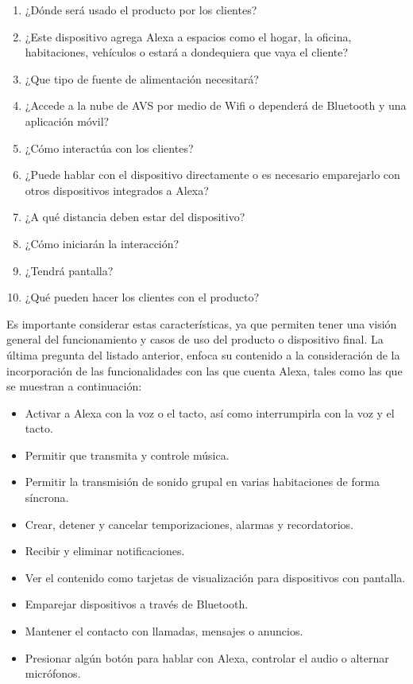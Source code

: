 \begin{enumerate}
  \item ¿Dónde será usado el producto por los clientes?
  \item ¿Este dispositivo agrega Alexa a espacios como el hogar, la oficina, habitaciones, vehículos o estará a dondequiera que vaya el cliente?
  \item ¿Que tipo de fuente de alimentación necesitará?
  \item ¿Accede a la nube de AVS por medio de Wifi o dependerá de Bluetooth y una aplicación móvil?
  \item ¿Cómo interactúa con los clientes?
  \item ¿Puede hablar con el dispositivo directamente o es necesario emparejarlo con otros dispositivos integrados a Alexa?
  \item ¿A qué distancia deben estar del dispositivo?
  \item ¿Cómo iniciarán la interacción?
  \item ¿Tendrá pantalla?
  \item ¿Qué pueden hacer los clientes con el producto?
\end{enumerate}

Es importante considerar estas características, ya que permiten tener una visión general del funcionamiento y casos de uso del producto o dispositivo final. La última pregunta del listado anterior, enfoca su contenido a la consideración de la incorporación de las funcionalidades con las que cuenta Alexa, tales como las que se muestran a continuación:

\begin{itemize}
  \item Activar a Alexa con la voz o el tacto, así como interrumpirla con la voz y el tacto.
  \item Permitir que transmita y controle música.
  \item Permitir la transmisión de sonido grupal en varias habitaciones de forma síncrona.
  \item Crear, detener y cancelar temporizaciones, alarmas y recordatorios.
  \item Recibir y eliminar notificaciones.
  \item Ver el contenido como tarjetas de visualización para dispositivos con pantalla.
  \item Emparejar dispositivos a través de Bluetooth.
  \item Mantener el contacto con llamadas, mensajes o anuncios.
  \item Presionar algún botón para hablar con Alexa, controlar el audio o alternar micrófonos.
\end{itemize}

